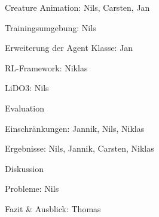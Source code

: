 \begin{thallok}
\begin{thallok}
		\item Creature Animation: Nils, Carsten, Jan
		\begin{thallok}
			\item Trainingsumgebung: Nils
			\item Erweiterung der Agent Klasse: Jan
			\item RL-Framework: Niklas
			\item LiDO3: Nils
		\end{thallok}
	\end{thallok}
	\item Evaluation
	\begin{thallok}
		\item Einschränkungen: Jannik, Nils, Niklas
		\item Ergebnisse: Nils, Jannik, Carsten, Niklas
		\item Diskussion
		\item Probleme: Nils
	\end{thallok}
	\item Fazit \& Ausblick: Thomas
\end{thallok}

